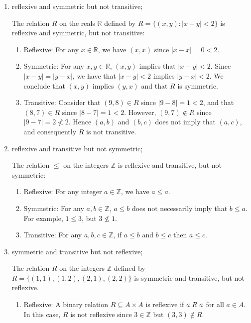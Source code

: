 \documentclass[a4paper,12pt]{article}
\begin{document}
\begin{enumerate}[label=(\alph*)]
\item reflexive and symmetric but not transitive;

The relation $R$ on the reals $\mathbb{R}$ defined by $R = \{(x,y) : |x-y| < 2\}$ is reflexive and symmetric, but not transitive:

\begin{enumerate}
\item Reflexive: For any $x \in \mathbb{R}$, we have $(x,x)$ since $|x -x| = 0 < 2$.
\item Symmetric: For any $x, y \in \mathbb{R}$, $(x,y)$ implies that $|x-y| < 2$. Since $|x-y| = |y-x|$, we have that $|x-y| < 2$ implies  $|y-x| < 2$. We conclude that $(x,y)$ implies $(y,x)$ and that $R$ is symmetric.
\item Transitive: Consider that $(9,8) \in R$ since $|9-8| = 1 < 2$, and that $(8,7) \in R$ since $|8-7| = 1 < 2$. However, $(9,7) \not\in R$ since $|9-7| = 2 \not< 2$. Hence $(a,b)$ and $(b,c)$ does not imply that $(a,c)$, and consequently $R$ is not transitive. 
\end{enumerate}

\item reflexive and transitive but not symmetric;

The relation $\le$ on the integers $\mathbb{Z}$ is reflexive and transitive, but not symmetric:

\begin{enumerate}
\item Reflexive: For any integer $a \in \mathbb{Z}$, we have $a \le a$.
\item Symmetric: For any $a, b \in \mathbb{Z}$, $a \le b$ does not necessarily imply that $b \le a$. For example, $1 \le 3$, but $3 \not\le 1$.
\item Transitive: For any $a, b, c \in \mathbb{Z}$, if $a \le b$ and $b \le c$ then $a \le c$.
\end{enumerate}

\item symmetric and transitive but not reflexive; 

The relation $R$ on the integers $\mathbb{Z}$ defined by $R = \{(1,1), (1,2), (2,1), (2,2)\}$ is symmetric and transitive, but not reflexive. 

\begin{enumerate}
\item Reflexive: A binary relation $R \subseteq A \times A$ is reflexive if $a \hspace{1mm} R \hspace{1mm} a$ for all $a \in A$. In this case, $R$ is not reflexive since $3 \in \mathbb{Z}$ but $(3,3) \not\in R$.


\end{enumerate}
\end{enumerate}
\end{document}
